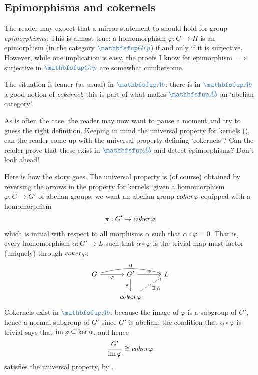 \subsection{Epimorphisms and cokernels}
\label{subsec:groups:epimorphisms-and-cokernels}
The reader may expect that a mirror statement to
 should
hold for group \emph{epimorphisms}. This is almost true: a
homomorphism $\varphi : G \to H$ is an epimorphism (in the category
$\categ{Grp}$) if and only if it is surjective. However, while one
implication is easy, the proofs I know for epimorphism $\implies$
surjective in $\categ{Grp}$ are somewhat cumbersome.

The situation is leaner (as usual) in $\categ{Ab}$: there is in
$\categ{Ab}$ a good notion of \emph{cokernel}; this is part of what
makes $\categ{Ab}$ an `abelian category'.

As is often the case, the reader may now want to pause a moment and
try to guess the right definition. Keeping in mind the universal
property for kernels
(), can the
reader come up with the universal property defining `cokernels'? Can
the reader prove that these exist in $\categ{Ab}$ and detect
epimorphisms? Don't look ahead!

Here is how the story goes. The universal property is (of course)
obtained by reversing the arrows in the property for kernels: given a
homomorphism $\varphi : G \to G'$ of abelian groups, we want an
abelian group $coker\varphi$ equipped with a homomorphism
\[
  \pi : G' \to coker\varphi
\]
which is initial with respect to all morphisms $\alpha$ such that
$\alpha \circ \varphi = 0$. That is, every homomorphism
$\alpha : G' \to L$ such that $\alpha \circ \varphi$ is the trivial
map must factor (uniquely) through $coker\varphi$:
\[
  \begin{tikzcd}
    G \arrow[rr, "0", bend left=15] \arrow[r, "\varphi"'] & G'
    \arrow[r, "\alpha"] \arrow[d, "\pi"'] & L \\
    & \coker\varphi \arrow[ur, dashed, "\exists !  \bar\alpha"'] &
  \end{tikzcd}
\]
Cokernels exist in $\categ{Ab}$: because the image of $\varphi$ is a
subgroup of $G'$, hence a normal subgroup of $G'$ since $G'$ is
abelian; the condition that $\alpha \circ \varphi$ is trivial says
that $\operatorname{im}\varphi \subseteq \ker\alpha$, and hence
\[
  \frac{G'}{\operatorname{im}\varphi} \cong coker\varphi
\]
satisfies the universal property, by
.

